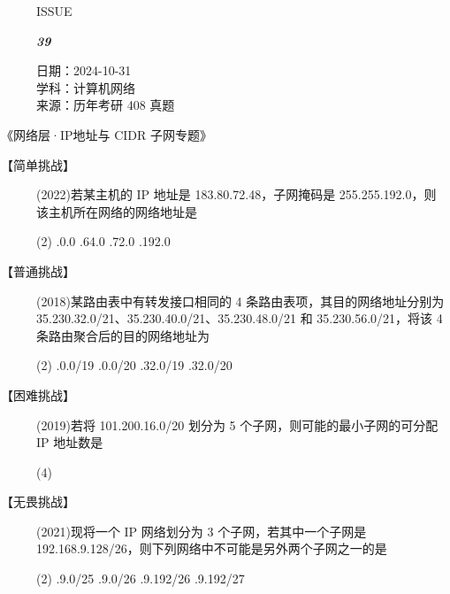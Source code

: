 \documentclass[UTF8]{ctexart}
\newcommand\Black[1]{\textcolor[gray]{0.3}{#1}}
\newcommand\Brown[1]{\textcolor[HTML]{998A4E}{#1}}
\newcommand\IssueNumber{39}
\newcommand\Date{2024-10-31}
\newcommand\Subject{计算机网络}
\newcommand\Source{历年考研 408 真题}
\begin{document}
\begin{figure}[H]
\hspace{1cm}
\begin{minipage}[t]{0.3\textwidth}
\centering
    \Brown{\Genshin ISSUE}

    \vspace{-0.6cm}
    \Huge \Issue\slshape\bfseries\Black{\IssueNumber}
\end{minipage}
\hfill
\begin{minipage}[t]{0.35\textwidth}
\centering
    \Brown{日期：\Date} \\
\vspace{-0.1cm}
    \Brown{学科：\Subject} \\
\vspace{-0.1cm}
    \Brown{来源：\Source}
\end{minipage}
\hspace{0.8cm}
\end{figure}

{\color{cyan!50!black}
《网络层·IP地址与 CIDR 子网专题》

\begin{description}
  \item[【简单挑战】] (2022)若某主机的 IP 地址是 183.80.72.48，子网掩码是 255.255.192.0，则该主机所在网络的网络地址是
  \begin{tasks}(2)
    .0.0
    .64.0
    .72.0
    .192.0
  \end{tasks}

  \item[【普通挑战】] (2018)某路由表中有转发接口相同的 4 条路由表项，其目的网络地址分别为 35.230.32.0/21、35.230.40.0/21、35.230.48.0/21 和 35.230.56.0/21，将该 4 条路由聚合后的目的网络地址为
  \begin{tasks}(2)
    .0.0/19
    .0.0/20
    .32.0/19
    .32.0/20
  \end{tasks}

  \item[【困难挑战】] (2019)若将 101.200.16.0/20 划分为 5 个子网，则可能的最小子网的可分配 IP 地址数是
  \begin{tasks}(4)
  \end{tasks}

  \item[【无畏挑战】] (2021)现将一个 IP 网络划分为 3 个子网，若其中一个子网是 192.168.9.128/26，则下列网络中不可能是另外两个子网之一的是
  \begin{tasks}(2)
    .9.0/25
    .9.0/26
    .9.192/26
    .9.192/27
  \end{tasks}
\end{description}

}
\end{document}
